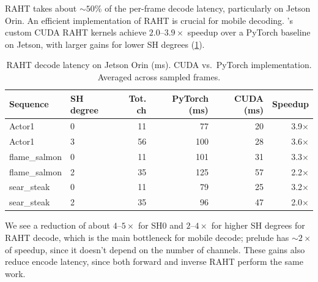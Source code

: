 %
RAHT takes about ${\sim}50$\% of the per-frame decode latency, particularly on Jetson Orin.
%
An efficient implementation of RAHT is crucial for mobile decoding.
%
\gsnfs{}'s custom CUDA RAHT kernels achieve $2.0$--$3.9\times$ speedup over a PyTorch baseline on Jetson, with larger gains for lower SH degrees (\cref{tab:jetson-raht-decode}).
%
\begin{table}[t]
  \centering
  {
  \begin{tabular}{l|l|r|rr|r}
    \hline
    \textbf{Sequence} & \textbf{SH degree} & \textbf{Tot. ch} & \textbf{PyTorch (ms)} & \textbf{CUDA (ms)} & \textbf{Speedup} \\
    \hline\hline
    Actor1         & 0 & 11 & 77  & 20 & 3.9$\times$ \\
    Actor1         & 3 & 56 & 100 & 28 & 3.6$\times$ \\
    flame\_salmon  & 0 & 11 & 101 & 31 & 3.3$\times$ \\
    flame\_salmon  & 2 & 35 & 125 & 57 & 2.2$\times$ \\
    sear\_steak    & 0 & 11 & 79  & 25 & 3.2$\times$ \\
    sear\_steak    & 2 & 35 & 96  & 47 & 2.0$\times$ \\
    \hline
    \end{tabular}
  }
  \caption{RAHT decode latency on Jetson Orin (ms). CUDA vs.\ PyTorch implementation. Averaged across sampled frames.}
  \label{tab:jetson-raht-decode}
\end{table}
%
We see a reduction of about $4$--$5\times$ for SH0 and $2$--$4\times$ for higher SH degrees for RAHT decode, which is the main bottleneck for mobile decode; prelude has ${\sim}2\times$ of speedup, since it doesn't depend on the number of channels.
%
These gains also reduce encode latency, since both forward and inverse RAHT perform the same work.

